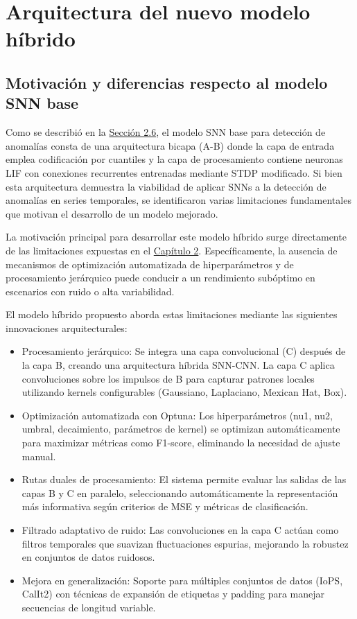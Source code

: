 \section{Arquitectura del nuevo modelo híbrido}

\subsection{Motivación y diferencias respecto al modelo SNN base}

Como se describió en la \hyperref[sec:arquitectura-snn-base]{Sección 2.6}, el modelo SNN base para detección de anomalías consta de una arquitectura bicapa (A-B) donde la capa de entrada emplea codificación por cuantiles y la capa de procesamiento contiene neuronas LIF con conexiones recurrentes entrenadas mediante STDP modificado. Si bien esta arquitectura demuestra la viabilidad de aplicar SNNs a la detección de anomalías en series temporales, se identificaron varias limitaciones fundamentales que motivan el desarrollo de un modelo mejorado.

La motivación principal para desarrollar este modelo híbrido surge directamente de las limitaciones expuestas en el \hyperref[chap:fundamentos]{Capítulo 2}. Específicamente, la ausencia de mecanismos de optimización automatizada de hiperparámetros y de procesamiento jerárquico puede conducir a un rendimiento subóptimo en escenarios con ruido o alta variabilidad.

El modelo híbrido propuesto aborda estas limitaciones mediante las siguientes innovaciones arquitecturales:

\begin{itemize}
    \item Procesamiento jerárquico: Se integra una capa convolucional (C) después de la capa B, creando una arquitectura híbrida SNN-CNN. La capa C aplica convoluciones sobre los impulsos de B para capturar patrones locales utilizando kernels configurables (Gaussiano, Laplaciano, Mexican Hat, Box).
    
    \item Optimización automatizada con Optuna: Los hiperparámetros (nu1, nu2, umbral, decaimiento, parámetros de kernel) se optimizan automáticamente para maximizar métricas como F1-score, eliminando la necesidad de ajuste manual.
    
    \item Rutas duales de procesamiento: El sistema permite evaluar las salidas de las capas B y C en paralelo, seleccionando automáticamente la representación más informativa según criterios de MSE y métricas de clasificación.
    
    \item Filtrado adaptativo de ruido: Las convoluciones en la capa C actúan como filtros temporales que suavizan fluctuaciones espurias, mejorando la robustez en conjuntos de datos ruidosos.
    
    \item Mejora en generalización: Soporte para múltiples conjuntos de datos (IoPS, CalIt2) con técnicas de expansión de etiquetas y padding para manejar secuencias de longitud variable.
\end{itemize}

